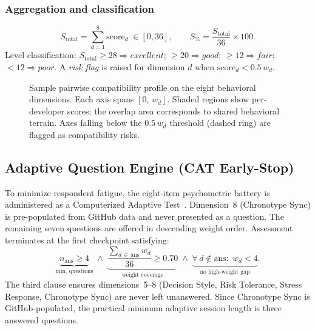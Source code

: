 \documentclass[conference]{IEEEtran}
\begin{document}
\subsubsection*{Aggregation and classification}
\begin{equation}
  S_{\mathrm{total}} = \sum_{d=1}^{8} \mathrm{score}_d \;\in [0,36],\qquad
  S_{\%} = \frac{S_{\mathrm{total}}}{36}\times 100.
  \label{eq:total}
\end{equation}
Level classification: $S_{\mathrm{total}} \geq 28 \Rightarrow
\textit{excellent}$; $\geq 20 \Rightarrow \textit{good}$;
$\geq 12 \Rightarrow \textit{fair}$; $< 12 \Rightarrow \textit{poor}$.
A \emph{risk flag} is raised for dimension $d$ when
$\mathrm{score}_d < 0.5\,w_d$.

\begin{figure}[t]
  \centering
  \caption{Sample pairwise compatibility profile on the eight
    behavioral dimensions.
    Each axis spans $[0,\,w_d]$.
    Shaded regions show per-developer scores; the overlap area
    corresponds to shared behavioral terrain.
    Axes falling below the $0.5\,w_d$ threshold (dashed ring) are
    flagged as compatibility risks.}
  \label{fig:radar}
\end{figure}

\subsection{Adaptive Question Engine (CAT Early-Stop)}
\label{sec:cat}

To minimize respondent fatigue, the eight-item psychometric battery
is administered as a Computerized Adaptive Test~\cite{vander2000cat}.
Dimension~8 (Chronotype Sync) is pre-populated from GitHub data and
never presented as a question.
The remaining seven questions are offered in descending weight order.
Assessment terminates at the first checkpoint satisfying:
\begin{equation}
  \underbrace{n_{\mathrm{ans}} \geq 4}_{\text{min. questions}}
  \;\land\;
  \underbrace{\frac{\sum_{d\,\in\,\mathrm{ans}} w_d}{36} \geq 0.70}_{\text{weight coverage}}
  \;\land\;
  \underbrace{\forall\,d \notin \mathrm{ans}:\;w_d < 4}_{\text{no high-weight gap}}.
  \label{eq:catstop}
\end{equation}
The third clause ensures dimensions~5–8 (Decision Style, Risk
Tolerance, Stress Response, Chronotype Sync) are never left unanswered.
Since Chronotype Sync is GitHub-populated, the practical minimum
adaptive session length is three answered questions.
\end{document}
